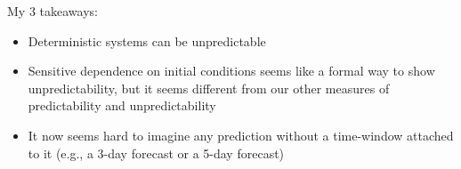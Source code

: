 \documentclass[aspectratio=169]{beamer}
\begin{document}
\begin{frame}

My 3 takeaways:
\begin{itemize}
\item Deterministic systems can be unpredictable 
\pause
\item Sensitive dependence on initial conditions seems like a formal way to show unpredictability, but it seems different from our other measures of predictability and unpredictability
\pause
\item It now seems hard to imagine any prediction without a time-window attached to it (e.g., a 3-day forecast or a 5-day forecast)
\end{itemize}

\end{frame}
\frame{\titlepage}
\end{document}

